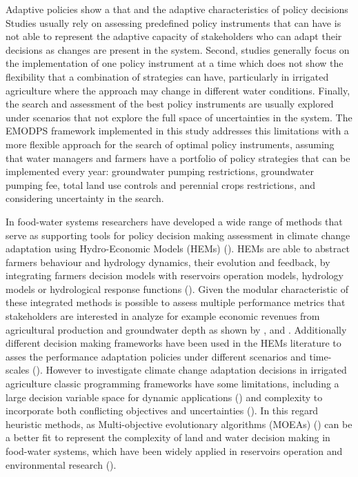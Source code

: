 \documentclass[11pt,a4paper]{article}
\begin{document}
Adaptive policies show a that and the adaptive characteristics of policy decisions
Studies usually rely on assessing predefined policy instruments that can have is not able to represent the adaptive capacity of stakeholders who can adapt their decisions as changes are present in the system. Second, studies generally focus on the implementation of one policy instrument at a time which does not show the flexibility that a combination of strategies can have, particularly in irrigated agriculture where the approach may change in different water conditions. Finally, the search and assessment of the best policy instruments are usually explored under scenarios that not explore the full space of uncertainties in the system. The EMODPS framework implemented in this study addresses this limitations with a more flexible approach for the search of optimal policy instruments, assuming that water managers and farmers have a portfolio of policy strategies that can be implemented every year: groundwater pumping restrictions, groundwater pumping fee, total land use controls and perennial crops restrictions, and considering uncertainty in the search. 

In food-water systems researchers have developed a wide range of methods that serve as supporting tools for policy decision making assessment in climate change adaptation using Hydro-Economic Models (HEMs) (\cite{ward_hydroeconomic_2021}). HEMs are able to abstract farmers behaviour and hydrology dynamics, their evolution and feedback, by integrating farmers decision models with reservoirs operation models, hydrology models or hydrological response functions (\cite{harou_hydro-economic_2009}). Given the modular characteristic of these integrated methods is possible to assess multiple performance metrics that stakeholders are interested in analyze for example economic revenues from agricultural production and groundwater depth as shown by \textcite{macewan_hydroeconomic_2017}, \textcite{afshar_multi-objective_2020} and \textcite{graveline_combining_2019}. Additionally different decision making frameworks have been used in the HEMs literature to asses the performance adaptation policies under different scenarios and time-scales (\cite{waldman_agricultural_2020,robert_processes_2016}). However to investigate climate change adaptation decisions in irrigated agriculture classic programming frameworks have some limitations, including a large decision variable space for dynamic applications (\cite{taylor_applications_2019}) and complexity to incorporate both conflicting objectives and uncertainties (\cite{herman_climate_2020}). In this regard heuristic methods, as Multi-objective evolutionary algorithms (MOEAs) (\cite{coello_evolutionary_2007}) can be a better fit to represent the complexity of land and water decision making in food-water systems, which have been widely applied in reservoirs operation and environmental research (\cite{maier_evolutionary_2014}).
\end{document}
